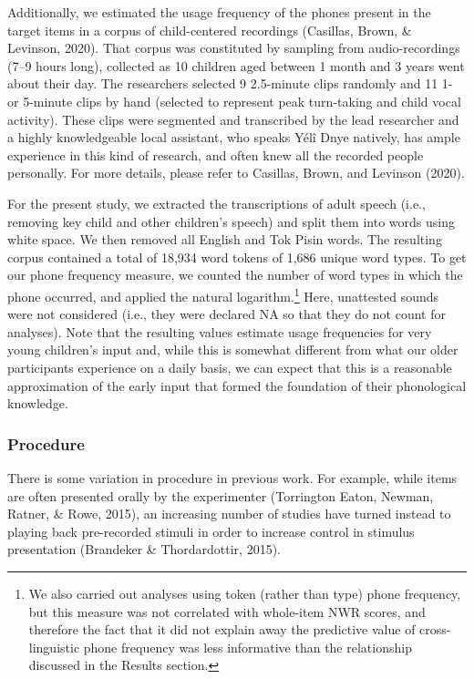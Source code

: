 \documentclass[
  american,
  ,man,floatsintext]{apa6}
\begin{document}
Additionally, we estimated the usage frequency of the phones present in the target items in a corpus of child-centered recordings (Casillas, Brown, \& Levinson, 2020). That corpus was constituted by sampling from audio-recordings (7--9 hours long), collected as 10 children aged between 1 month and 3 years went about their day. The researchers selected 9 2.5-minute clips randomly and 11 1- or 5-minute clips by hand (selected to represent peak turn-taking and child vocal activity). These clips were segmented and transcribed by the lead researcher and a highly knowledgeable local assistant, who speaks Yélî Dnye natively, has ample experience in this kind of research, and often knew all the recorded people personally. For more details, please refer to Casillas, Brown, and Levinson (2020).

For the present study, we extracted the transcriptions of adult speech (i.e., removing key child and other children's speech) and split them into words using white space. We then removed all English and Tok Pisin words. The resulting corpus contained a total of 18,934 word tokens of 1,686 unique word types. To get our phone frequency measure, we counted the number of word types in which the phone occurred, and applied the natural logarithm.\footnote{We also carried out analyses using token (rather than type) phone frequency, but this measure was not correlated with whole-item NWR scores, and therefore the fact that it did not explain away the predictive value of cross-linguistic phone frequency was less informative than the relationship discussed in the Results section.} Here, unattested sounds were not considered (i.e., they were declared NA so that they do not count for analyses). Note that the resulting values estimate usage frequencies for very young children's input and, while this is somewhat different from what our older participants experience on a daily basis, we can expect that this is a reasonable approximation of the early input that formed the foundation of their phonological knowledge.

\hypertarget{procedure}{%
\subsubsection{Procedure}\label{procedure}}

There is some variation in procedure in previous work. For example, while items are often presented orally by the experimenter (Torrington Eaton, Newman, Ratner, \& Rowe, 2015), an increasing number of studies have turned instead to playing back pre-recorded stimuli in order to increase control in stimulus presentation (Brandeker \& Thordardottir, 2015).
\end{document}
